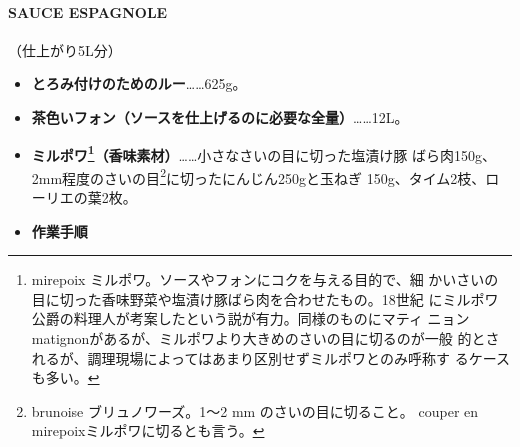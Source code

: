 \begin{recette}
\hypertarget{sauce-espagnole}{%
\paragraph{SAUCE ESPAGNOLE}\label{sauce-espagnole}}


（仕上がり5L分）

\begin{itemize}
\item
  \textbf{とろみ付けのためのルー}\ldots{}\ldots{}625g。
\item
  \textbf{茶色いフォン（ソースを仕上げるのに必要な全量）}\ldots{}\ldots{}12L。
\item
  \textbf{ミルポワ\footnote{mirepoix
    ミルポワ。ソースやフォンにコクを与える目的で、細
    かいさいの目に切った香味野菜や塩漬け豚ばら肉を合わせたもの。18世紀
    にミルポワ公爵の料理人が考案したという説が有力。同様のものにマティ
    ニョンmatignonがあるが、ミルポワより大きめのさいの目に切るのが一般
    的とされるが、調理現場によってはあまり区別せずミルポワとのみ呼称す
    るケースも多い。}（香味素材）}\ldots{}\ldots{}小さなさいの目に切った塩漬け豚
  ばら肉150g、2mm程度のさいの目\footnote{brunoise ブリュノワーズ。1〜2
    mm のさいの目に切ること。 couper en mirepoixミルポワに切るとも言う。}に切ったにんじん250gと玉ねぎ
  150g、タイム2枝、ローリエの葉2枚。\hypertarget{mirepoix}{}
  \label{mirepoix}
\item
  \textbf{作業手順}
\end{itemize}


\end{recette}

